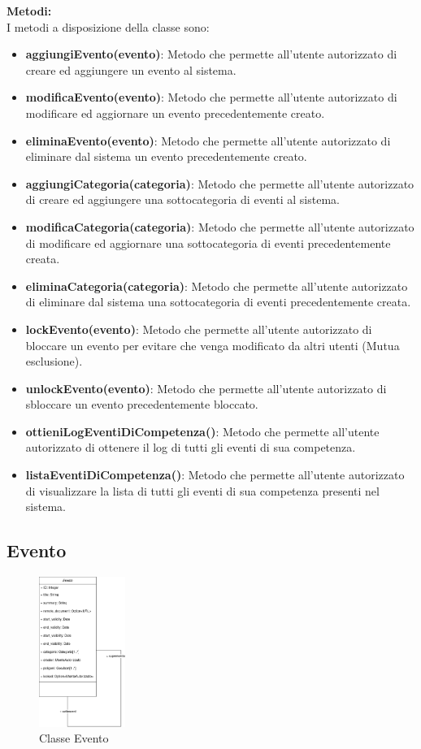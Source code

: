 \textbf{Metodi:}\\
I metodi a disposizione della classe sono:
\begin{itemize}
    \item \textbf{aggiungiEvento(evento)}: Metodo che permette all'utente autorizzato di creare ed aggiungere un evento al sistema.
    \item \textbf{modificaEvento(evento)}: Metodo che permette all'utente autorizzato di modificare ed aggiornare un evento precedentemente creato.
    \item \textbf{eliminaEvento(evento)}: Metodo che permette all'utente autorizzato di eliminare dal sistema un evento precedentemente creato.
    \item \textbf{aggiungiCategoria(categoria)}: Metodo che permette all'utente autorizzato di creare ed aggiungere una sottocategoria di eventi al sistema.
    \item \textbf{modificaCategoria(categoria)}: Metodo che permette all'utente autorizzato di modificare ed aggiornare una sottocategoria di eventi precedentemente creata.
    \item \textbf{eliminaCategoria(categoria)}: Metodo che permette all'utente autorizzato di eliminare dal sistema una sottocategoria di eventi precedentemente creata.
    \item \textbf{lockEvento(evento)}: Metodo che permette all'utente autorizzato di bloccare un evento per evitare che venga modificato da altri utenti (Mutua esclusione).
    \item \textbf{unlockEvento(evento)}: Metodo che permette all'utente autorizzato di sbloccare un evento precedentemente bloccato.
    \item \textbf{ottieniLogEventiDiCompetenza()}: Metodo che permette all'utente autorizzato di ottenere il log di tutti gli eventi di sua competenza.
    \item \textbf{listaEventiDiCompetenza()}: Metodo che permette all'utente autorizzato di visualizzare la lista di tutti gli eventi di sua competenza presenti nel sistema.
\end{itemize}

\clearpage

\subsection{Evento}

\begin{figure}[htbp]
    \centering
    \includegraphics[width=0.25\textwidth]{Images/Evento-Class.png}
    \caption{Classe Evento}
    \label{fig:evento}
\end{figure}

